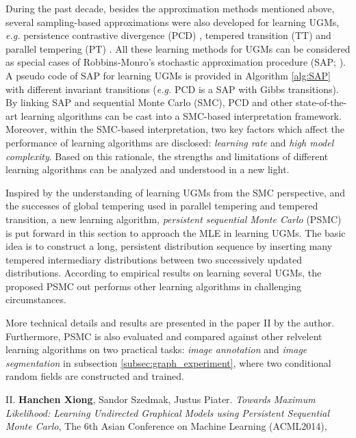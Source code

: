 During the past decade, besides the approximation methods mentioned above, several sampling-based approximations were also developed for learning 
UGMs, \emph{e.g.} persistence contrastive divergence (PCD) \citep{tielemanPcd2008},  tempered transition (TT) \citep{Salakhutdinov_learningin} and parallel tempering (PT) \citep{desjardins2010}. 
All these learning methods for
UGMs can be considered as special cases of Robbins-Monro’s stochastic approximation procedure (SAP; \citealt{RobbinMonro,Younes1988}). A pseudo code of SAP for learning UGMs is provided in Algorithm \ref{alg:SAP}  
with different invariant transitions (\emph{e.g.} PCD is a SAP with Gibbs transitions). By linking SAP
and sequential Monte Carlo (SMC), PCD and other state-of-the-art learning algorithms can be cast into a
SMC-based interpretation framework. Moreover, within the SMC-based interpretation, two key factors
which affect the performance of learning algorithms are disclosed: \emph{learning rate} and \emph{high model complexity}.
Based on this rationale, the strengths and limitations of different learning algorithms can be analyzed
and understood in a new light.

Inspired by the understanding of learning UGMs from the SMC perspective, and the successes of global
tempering used in parallel tempering and tempered transition, a new learning algorithm, \emph{persistent sequential Monte Carlo} (PSMC) is put forward in this section to approach the
MLE in learning UGMs. The basic idea is to construct a long, persistent distribution sequence by 
inserting many tempered intermediary distributions between two successively updated
distributions. According to empirical results on learning several UGMs, the proposed PSMC out
performs other learning algorithms in challenging circumstances.

More technical details and results are presented in the paper II by the author. Furthermore, PSMC is also evaluated and compared against other relvelent learning algorithms 
on two practical tasks: \emph{image annotation} and \emph{image segmentation} in 
subsection \ref{subsec:graph_experiment}, where two conditional random fields are constructed and trained.    


\begin{shaded}
{\Huge II.} \textbf{Hanchen Xiong}, Sandor Szedmak, Justus Piater. {\it Towards Maximum Likelihood: Learning Undirected Graphical Models using Persistent Sequential Monte Carlo}, The 6th Asian Conference on Machine Learning (ACML2014), 
\end{shaded}


